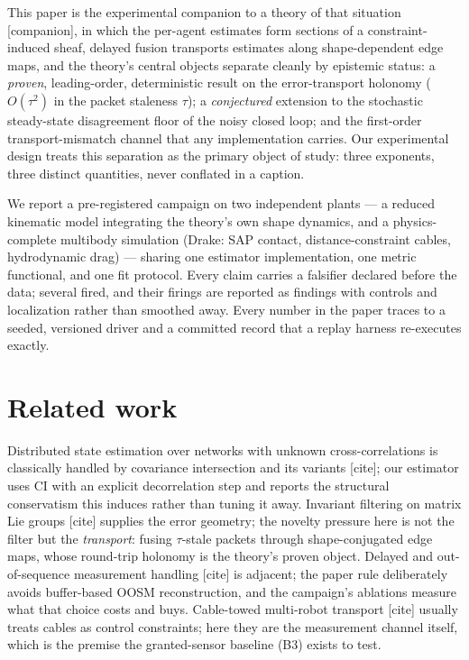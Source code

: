\documentclass[letterpaper, 10pt, journal]{IEEEtran}
\begin{document}
This paper is the experimental companion to a theory of that situation
[companion], in which the per-agent estimates form sections of a
constraint-induced sheaf, delayed fusion transports estimates along
shape-dependent edge maps, and the theory's central objects separate cleanly by
epistemic status: a \emph{proven}, leading-order, deterministic result on the
error-transport holonomy ($O(\tau^2)$ in the packet staleness $\tau$); a
\emph{conjectured} extension to the stochastic steady-state disagreement floor
of the noisy closed loop; and the first-order transport-mismatch channel that
any implementation carries. Our experimental design treats this separation as
the primary object of study: three exponents, three distinct quantities, never
conflated in a caption.

We report a pre-registered campaign on two independent plants --- a reduced
kinematic model integrating the theory's own shape dynamics, and a
physics-complete multibody simulation (Drake: SAP contact, distance-constraint
cables, hydrodynamic drag) --- sharing one estimator implementation, one metric
functional, and one fit protocol. Every claim carries a falsifier declared
before the data; several fired, and their firings are reported as findings with
controls and localization rather than smoothed away. Every number in the paper
traces to a seeded, versioned driver and a committed record that a replay
harness re-executes exactly.

\section{Related work}
Distributed state estimation over networks with unknown cross-correlations is
classically handled by covariance intersection and its variants [cite]; our
estimator uses CI with an explicit decorrelation step and reports the
structural conservatism this induces rather than tuning it away. Invariant
filtering on matrix Lie groups [cite] supplies the error geometry; the novelty
pressure here is not the filter but the \emph{transport}: fusing
$\tau$-stale packets through shape-conjugated edge maps, whose round-trip
holonomy is the theory's proven object. Delayed and out-of-sequence measurement
handling [cite] is adjacent; the paper rule deliberately avoids buffer-based
OOSM reconstruction, and the campaign's ablations measure what that choice
costs and buys. Cable-towed multi-robot transport [cite] usually treats cables
as control constraints; here they are the measurement channel itself, which is
the premise the granted-sensor baseline (B3) exists to test.
\end{document}

